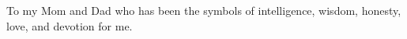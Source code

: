 \vspace*{7cm}
\begin{center}
To my Mom and Dad who has been the symbols of intelligence, wisdom, honesty, love, and devotion for me.  
\end{center}

